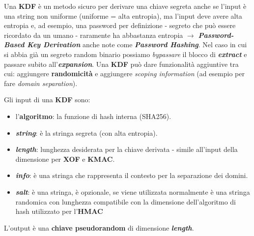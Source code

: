 \begin{flushleft}
    Una \textbf{KDF} è un metodo sicuro per derivare una chiave segreta anche se l'input è una string non uniforme (uniforme = alta entropia), ma l'input deve avere alta entropia e, ad esempio, una password per definizione - segreto che può essere ricordato da un umano - raramente ha abbastanza entropia $\rightarrow$ \textbf{\textit{Password-Based Key Derivation}} anche note come \textbf{\textit{Password Hashing}}. Nel caso in cui si abbia già un segreto random binario possiamo \textit{bypassare} il blocco di \textbf{\textit{extract}} e passare subito all'\textbf{\textit{expansion}}. Una \textbf{KDF} può dare funzionalità aggiuntive tra cui: aggiungere \textbf{randomicità} e aggiungere \textit{scoping information} (ad esempio per fare \textit{domain separation}).

    \smallskip

    Gli input di una \textbf{KDF} sono:
    \begin{itemize}[nosep]
        \item l'\textbf{algoritmo}: la funzione di hash interna (SHA256).
        \item \textbf{\textit{string}}: è la stringa segreta (con alta entropia).
        \item \textbf{\textit{length}}: lunghezza desiderata per la chiave derivata - simile all'input della dimensione per \textbf{XOF} e \textbf{KMAC}.
        \item \textbf{\textit{info}}: è una stringa che rappresenta il contesto per la separazione dei domini.
        \item \textbf{\textit{salt}}: è una stringa, è opzionale, se viene utilizzata normalmente è una stringa randomica con lunghezza compatibile con la dimensione dell'algoritmo di hash utilizzato per l'\textbf{HMAC}
    \end{itemize}
    L'output è una \textbf{chiave pseudorandom} di dimensione \textbf{\textit{length}}.
\end{flushleft}

